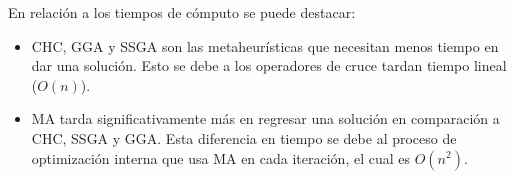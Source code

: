 En relación a los tiempos de cómputo se puede destacar:

\begin{itemize}

\item CHC, GGA y SSGA son las metaheurísticas que necesitan menos tiempo en dar una solución. Esto se debe a los operadores de cruce tardan tiempo lineal ($O(n)$).



\item MA tarda significativamente más en regresar una solución en comparación a CHC, SSGA y GGA. Esta diferencia en tiempo se debe al proceso de optimización interna que usa MA en cada iteración, el cual es $O(n^2)$.


\end{itemize}


%
%


